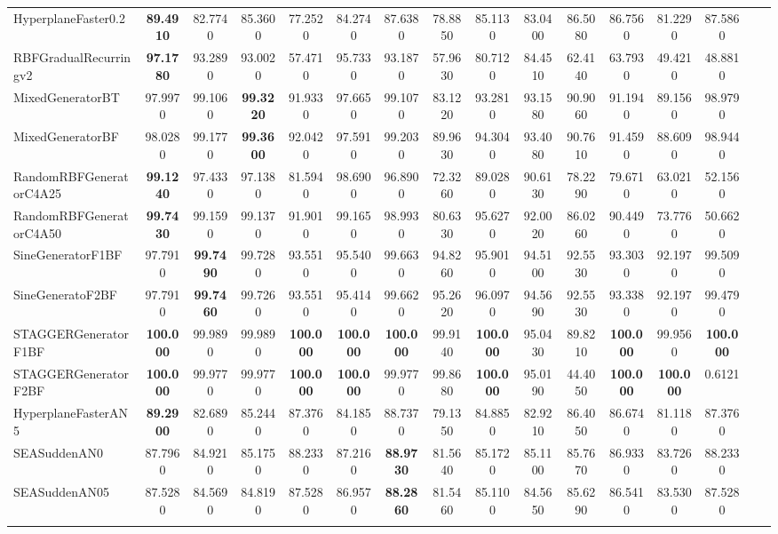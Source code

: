 \documentclass[reqno]{vcuthesis}
\numberwithin{equation}{chapter}
\begin{document}
\begin{table}[H]
{\begin{tabularx}{1.5\textwidth}{l@{\extracolsep{\fill}}ccccccccccccccc}
HyperplaneFaster0.2 &\textbf{89.4910} &82.7740 &85.3600 &77.2520 &84.2740 &87.6380 &78.8850 &85.1130 &83.0400 &86.5080 &86.7560 &81.2290 &87.5860 &  \\
RBFGradualRecurringv2 &\textbf{97.1780} &93.2890 &93.0020 &57.4710 &95.7330 &93.1870 &57.9630 &80.7120 &84.4510 &62.4140 &63.7930 &49.4210 &48.8810 &  \\
MixedGeneratorBT &97.9970 &99.1060 &\textbf{99.3220} &91.9330 &97.6650 &99.1070 &83.1220 &93.2810 &93.1580 &90.9060 &91.1940 &89.1560 &98.9790 &  \\
MixedGeneratorBF &98.0280 &99.1770 &\textbf{99.3600} &92.0420 &97.5910 &99.2030 &89.9630 &94.3040 &93.4080 &90.7610 &91.4590 &88.6090 &98.9440 &  \\
RandomRBFGeneratorC4A25 &\textbf{99.1240} &97.4330 &97.1380 &81.5940 &98.6900 &96.8900 &72.3260 &89.0280 &90.6130 &78.2290 &79.6710 &63.0210 &52.1560 &  \\
RandomRBFGeneratorC4A50 &\textbf{99.7430} &99.1590 &99.1370 &91.9010 &99.1650 &98.9930 &80.6330 &95.6270 &92.0020 &86.0260 &90.4490 &73.7760 &50.6620 &  \\
SineGeneratorF1BF &97.7910 &\textbf{99.7490} &99.7280 &93.5510 &95.5400 &99.6630 &94.8260 &95.9010 &94.5100 &92.5530 &93.3030 &92.1970 &99.5090 &  \\
SineGeneratoF2BF &97.7910 &\textbf{99.7460} &99.7260 &93.5510 &95.4140 &99.6620 &95.2620 &96.0970 &94.5690 &92.5530 &93.3380 &92.1970 &99.4790 &  \\
STAGGERGeneratorF1BF &\textbf{100.000} &99.9890 &99.9890 &\textbf{100.000} &\textbf{100.000} &\textbf{100.000} &99.9140 &\textbf{100.000} &95.0430 &89.8210 &\textbf{100.000} &99.9560 &\textbf{100.000} &  \\
STAGGERGeneratorF2BF &\textbf{100.000} &99.9770 &99.9770 &\textbf{100.000} &\textbf{100.000} &99.9770 &99.8680 &\textbf{100.000} &95.0190 &44.4050 &\textbf{100.000} &\textbf{100.000} &0.6121 &  \\
HyperplaneFasterAN5 &\textbf{89.2900} &82.6890 &85.2440 &87.3760 &84.1850 &88.7370 &79.1350 &84.8850 &82.9210 &86.4050 &86.6740 &81.1180 &87.3760 &  \\
SEASuddenAN0 &87.7960 &84.9210 &85.1750 &88.2330 &87.2160 &\textbf{88.9730} &81.5640 &85.1720 &85.1100 &85.7670 &86.9330 &83.7260 &88.2330 &  \\
SEASuddenAN05 &87.5280 &84.5690 &84.8190 &87.5280 &86.9570 &\textbf{88.2860} &81.5460 &85.1100 &84.5650 &85.6290 &86.5410 &83.5300 &87.5280 &  \\
\noalign{\smallskip}\hline\noalign{\smallskip}

\end{tabularx}}
\end{table}
\end{document}
